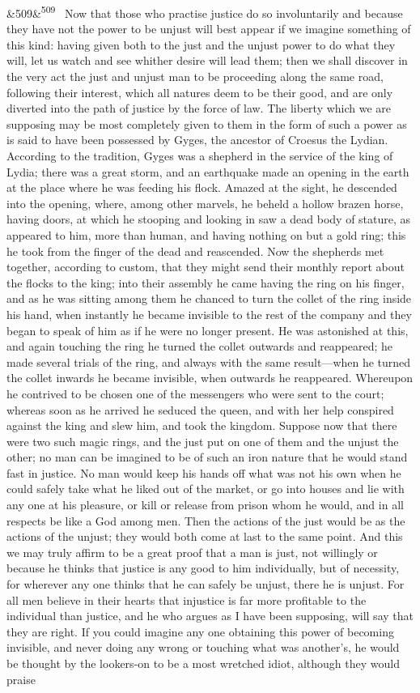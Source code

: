 \documentclass[12pt]{article}
\newcommand{\para}[1][]{\par\noindent\ifx&#1&\else\textsuperscript{\footnotesize #1}~\fi}
\begin{document}
\para[509] Now that those who practise justice do so involuntarily and because they have not the power to be unjust will best appear if we imagine something of this kind: having given both to the just and the unjust power to do what they will, let us watch and see whither desire will lead them; then we shall discover in the very act the just and unjust man to be proceeding along the same road, following their interest, which all natures deem to be their good, and are only diverted into the path of justice by the force of law. The liberty which we are supposing may be most completely given to them in the form of such a power as is said to have been possessed by Gyges, the ancestor of Croesus the Lydian. According to the tradition, Gyges was a shepherd in the service of the king of Lydia; there was a great storm, and an earthquake made an opening in the earth at the place where he was feeding his flock. Amazed at the sight, he descended into the opening, where, among other marvels, he beheld a hollow brazen horse, having doors, at which he stooping and looking in saw a dead body of stature, as appeared to him, more than human, and having nothing on but a gold ring; this he took from the finger of the dead and reascended. Now the shepherds met together, according to custom, that they might send their monthly report about the flocks to the king; into their assembly he came having the ring on his finger, and as he was sitting among them he chanced to turn the collet of the ring inside his hand, when instantly he became invisible to the rest of the company and they began to speak of him as if he were no longer present. He was astonished at this, and again touching the ring he turned the collet outwards and reappeared; he made several trials of the ring, and always with the same result---when he turned the collet inwards he became invisible, when outwards he reappeared. Whereupon he contrived to be chosen one of the messengers who were sent to the court; whereas soon as he arrived he seduced the queen, and with her help conspired against the king and slew him, and took the kingdom. Suppose now that there were two such magic rings, and the just put on one of them and the unjust the other; no man can be imagined to be of such an iron nature that he would stand fast in justice. No man would keep his hands off what was not his own when he could safely take what he liked out of the market, or go into houses and lie with any one at his pleasure, or kill or release from prison whom he would, and in all respects be like a God among men. Then the actions of the just would be as the actions of the unjust; they would both come at last to the same point. And this we may truly affirm to be a great proof that a man is just, not willingly or because he thinks that justice is any good to him individually, but of necessity, for wherever any one thinks that he can safely be unjust, there he is unjust. For all men believe in their hearts that injustice is far more profitable to the individual than justice, and he who argues as I have been supposing, will say that they are right. If you could imagine any one obtaining this power of becoming invisible, and never doing any wrong or touching what was another's, he would be thought by the lookers-on to be a most wretched idiot, although they would praise 
\end{document}
